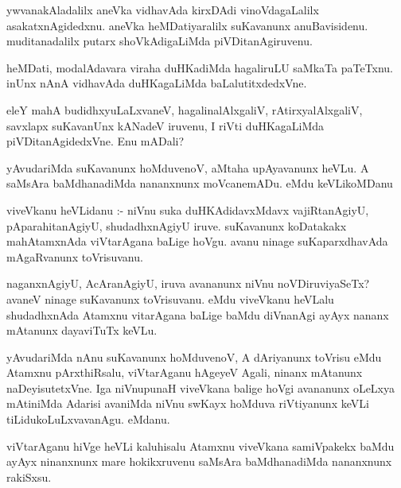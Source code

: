 \documentclass{article}
\begin{document}
\begin{mn}
ywvanakAladalilx aneVka vidhavAda kirxDAdi vinoVdagaLalilx asakatxnAgidedxnu.
 aneVka heMDatiyaralilx suKavanunx anuBavisidenu. muditanadalilx putarx 
 shoVkAdigaLiMda piVDitanAgiruvenu.
\end{mn}

\begin{mn}
heMDati, modalAdavara viraha duHKadiMda hagaliruLU saMkaTa paTeTxnu. inUnx 
nAnA vidhavAda duHKagaLiMda baLalutitxdedxVne.
\end{mn}

\begin{mn}
eleY mahA budidhxyuLaLxvaneV, hagalinalAlxgaliV, rAtirxyalAlxgaliV, 
savxlapx suKavanUnx kANadeV iruvenu, I riVti duHKagaLiMda piVDitanAgidedxVne.
Enu mADali?
\end{mn}

\begin{mn}
yAvudariMda suKavanunx hoMduvenoV, aMtaha upAyavanunx heVLu. A saMsAra 
baMdhanadiMda nananxnunx   moVcanemADu. eMdu keVLikoMDanu 
\end{mn}

\begin{mn}
viveVkanu heVLidanu :- niVnu suka duHKAdidavxMdavx vajiRtanAgiyU, 
pAparahitanAgiyU, shudadhxnAgiyU iruve. suKavanunx koDatakakx mahAtamxnAda 
viVtarAgana baLige hoVgu. avanu ninage suKaparxdhavAda mAgaRvanunx toVrisuvanu. 
\end{mn}

\begin{mn}
naganxnAgiyU, AcAranAgiyU, iruva avananunx niVnu noVDiruviyaSeTx?  avaneV
ninage suKavanunx toVrisuvanu. eMdu viveVkanu heVLalu shudadhxnAda Atamxnu 
vitarAgana baLige baMdu diVnanAgi ayAyx nananx mAtanunx dayaviTuTx keVLu.
\end{mn}

\begin{mn}
yAvudariMda nAnu suKavanunx  hoMduvenoV, A dAriyanunx toVrisu eMdu Atamxnu 
pArxthiRsalu,  viVtarAganu hAgeyeV Agali, ninanx mAtanunx naDeyisutetxVne.
Iga niVnupunaH viveVkana balige hoVgi avananunx oLeLxya mAtiniMda Adarisi
avaniMda niVnu swKayx hoMduva riVtiyanunx keVLi tiLidukoLuLxvavanAgu.  eMdanu. 
\end{mn}

\begin{mn}
viVtarAganu hiVge heVLi kaluhisalu Atamxnu viveVkana samiVpakekx baMdu ayAyx 
ninanxnunx mare hokikxruvenu saMsAra baMdhanadiMda nananxnunx rakiSxsu.
\end{mn}
\end{document}
